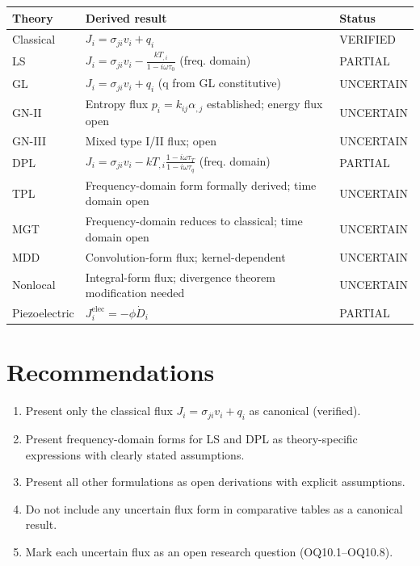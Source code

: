 \documentclass{article}
\begin{document}
\begin{table}[h]
\centering
\small
\begin{tabularx}{\textwidth}{@{}lXX@{}}
\toprule
\textbf{Theory} & \textbf{Derived result} & \textbf{Status} \\
\midrule
Classical & $J_i = \sigma_{ji}v_i + q_i$ & VERIFIED \\
LS & $J_i = \sigma_{ji}v_i - \frac{kT_{,i}}{1-i\omega\tau_0}$ (freq. domain) & PARTIAL \\
GL & $J_i = \sigma_{ji}v_i + q_i$ (q from GL constitutive) & UNCERTAIN \\
GN-II & Entropy flux $p_i = k_{ij}\alpha_{,j}$ established; energy flux open & UNCERTAIN \\
GN-III & Mixed type I/II flux; open & UNCERTAIN \\
DPL & $J_i = \sigma_{ji}v_i - kT_{,i}\frac{1-i\omega\tau_T}{1-i\omega\tau_q}$ (freq. domain) & PARTIAL \\
TPL & Frequency-domain form formally derived; time domain open & UNCERTAIN \\
MGT & Frequency-domain reduces to classical; time domain open & UNCERTAIN \\
MDD & Convolution-form flux; kernel-dependent & UNCERTAIN \\
Nonlocal & Integral-form flux; divergence theorem modification needed & UNCERTAIN \\
Piezoelectric & $J_i^{\text{elec}} = -\phi\dot{D}_i$ & PARTIAL \\
\bottomrule
\end{tabularx}
\end{table}

\section{Recommendations}

\begin{enumerate}
\item Present only the classical flux $J_i = \sigma_{ji}v_i + q_i$ as canonical (verified).
\item Present frequency-domain forms for LS and DPL as theory-specific expressions with clearly stated assumptions.
\item Present all other formulations as open derivations with explicit assumptions.
\item Do not include any uncertain flux form in comparative tables as a canonical result.
\item Mark each uncertain flux as an open research question (OQ10.1--OQ10.8).
\end{enumerate}
\end{document}
